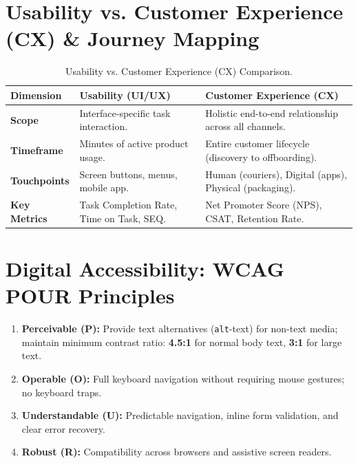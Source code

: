 \section{Usability vs. Customer Experience (CX) \& Journey Mapping}

\begin{table}[h!]
\centering
\small
\renewcommand{\arraystretch}{1.3}
\begin{tabularx}{\linewidth}{p{2.8cm}X X}
\toprule
\textbf{Dimension} & \textbf{Usability (UI/UX)} & \textbf{Customer Experience (CX)} \\
\midrule
\textbf{Scope} & Interface-specific task interaction. & Holistic end-to-end relationship across all channels. \\
\textbf{Timeframe} & Minutes of active product usage. & Entire customer lifecycle (discovery to offboarding). \\
\textbf{Touchpoints} & Screen buttons, menus, mobile app. & Human (couriers), Digital (apps), Physical (packaging). \\
\textbf{Key Metrics} & Task Completion Rate, Time on Task, SEQ. & Net Promoter Score (NPS), CSAT, Retention Rate. \\
\bottomrule
\end{tabularx}
\caption{Usability vs. Customer Experience (CX) Comparison.}
\end{table}

\section{Digital Accessibility: WCAG POUR Principles}

\begin{formulabox}
\begin{enumerate}[leftmargin=1.2em, itemsep=2pt]
    \item \textbf{Perceivable (P):} Provide text alternatives (\texttt{alt}-text) for non-text media; maintain minimum contrast ratio: \textbf{4.5:1} for normal body text, \textbf{3:1} for large text.
    \item \textbf{Operable (O):} Full keyboard navigation without requiring mouse gestures; no keyboard traps.
    \item \textbf{Understandable (U):} Predictable navigation, inline form validation, and clear error recovery.
    \item \textbf{Robust (R):} Compatibility across browsers and assistive screen readers.
\end{enumerate}
\end{formulabox}
